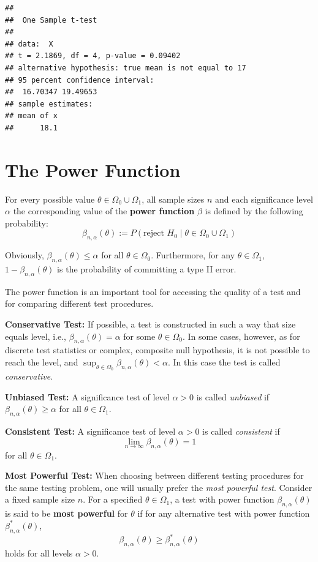 \documentclass[]{book}
\theoremstyle{definition}
\theoremstyle{definition}
\theoremstyle{definition}
\theoremstyle{remark}
\begin{document}
\begin{verbatim}
## 
##  One Sample t-test
## 
## data:  X
## t = 2.1869, df = 4, p-value = 0.09402
## alternative hypothesis: true mean is not equal to 17
## 95 percent confidence interval:
##  16.70347 19.49653
## sample estimates:
## mean of x 
##      18.1
\end{verbatim}

\hypertarget{PF1}{%
\section{The Power Function}\label{PF1}}

For every possible value \(\theta\in\Omega_0\cup\Omega_1\),
all sample sizes \(n\) and
each significance level \(\alpha\) the corresponding value of
the \textbf{power function} \(\beta\) is defined by the following probability:
\[
\beta_{n,\alpha}(\theta):=P(\text{reject } H_0\; |\; \theta\in\Omega_0\cup\Omega_1)
\]

Obviously, \(\beta_{n,\alpha}(\theta)\leq \alpha\) for all \(\theta\in\Omega_0\).
Furthermore, for any \(\theta\in\Omega_1\), \(1-\beta_{n,\alpha}(\theta)\) is the probability of committing a type II error.

The power function is an important tool for accessing the quality of a test and for comparing different test procedures.

\textbf{Conservative Test:}
If possible, a test is constructed in such a way that size equals level, i.e.,
\(\beta_{n,\alpha}(\theta)=\alpha\) for some \(\theta\in\Omega_0\).
In some cases, however, as for discrete test statistics or complex, composite null hypothesis, it is not possible to reach the level, and
\(\sup_{\theta\in\Omega_0}\beta_{n,\alpha}(\theta)<\alpha\).
In this case the test is called \emph{conservative}.

\textbf{Unbiased Test:}
A significance test of level \(\alpha>0\) is called \emph{unbiased} if \(\beta_{n,\alpha}(\theta)\ge\alpha\) for all \(\theta\in\Omega_1\).

\textbf{Consistent Test:}
A significance test of level \(\alpha>0\) is called \emph{consistent} if
\[\lim_{n\rightarrow \infty} \beta_{n,\alpha}(\theta) =1\]
for all \(\theta\in \Omega_1\).

\textbf{Most Powerful Test:}
When choosing between different testing procedures for the same testing problem, one will usually prefer
the \emph{most powerful test}. Consider a fixed sample size \(n\). For a specified \(\theta\in\Omega_1\), a test with power function \(\beta_{n,\alpha}(\theta)\) is said to be \textbf{most powerful} for \(\theta\) if for any alternative test with power function \(\beta^*_{n,\alpha}(\theta)\),
\[\beta_{n,\alpha}(\theta)\ge \beta^*_{n,\alpha}(\theta)\]
holds for all levels \(\alpha>0\).
\end{document}
